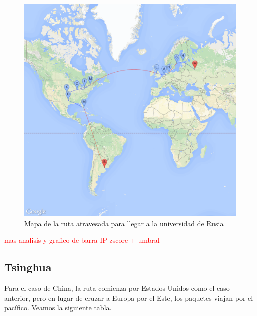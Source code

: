 \begin{figure}[H]
	\begin{center}
		  \includegraphics[scale=0.4]{../results/maps/MSU.png}
		  \caption{Mapa de la ruta atravesada para llegar a la universidad de Rusia}
	\end{center}
\end{figure}

\textcolor{red}{mas analisis y grafico de barra IP zscore + umbral}

\subsection{Tsinghua}

Para el caso de China, la ruta comienza por Estados Unidos como el caso anterior, pero en lugar de cruzar a Europa por el Este, los paquetes viajan por el pac\'ifico.
Veamos la siguiente tabla.

